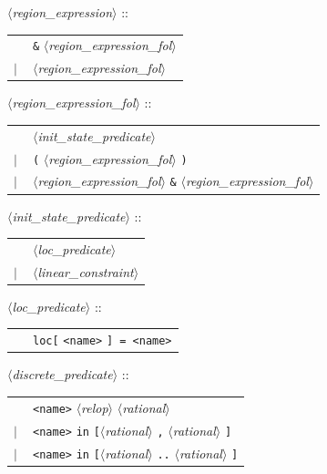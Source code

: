 \documentclass[a4paper,11pt]{report}
\newcommand{\nt}[1]{$\langle$\emph{#1}$\rangle$}
\newcommand{\regleGrammaire}[1]{\bigskip \noindent \nt{#1} :: \\}
\newcommand{\styleIMI}[1]{\textcolor{imicolor}{\texttt{#1}}}
\begin{document}
\regleGrammaire{region\_expression}
\begin{tabular}{l l}
	\  & \styleIMI{\&} \nt{region\_expression\_fol}\\
	$|$ & \nt{region\_expression\_fol}\\
\end{tabular}

\regleGrammaire{region\_expression\_fol}
\begin{tabular}{l l}
	\  & \nt{init\_state\_predicate} \\
	$|$ & \styleIMI{(} \nt{region\_expression\_fol} \styleIMI{)} \\
	$|$ & \nt{region\_expression\_fol} \styleIMI{\&} \nt{region\_expression\_fol} \\
\end{tabular}


\regleGrammaire{init\_state\_predicate}
\begin{tabular}{l l}
	\  & \nt{loc\_predicate} \\
	$|$ & \nt{linear\_constraint} \\
\end{tabular}

\regleGrammaire{loc\_predicate}
\begin{tabular}{l l}
	\  & \styleIMI{loc[} \styleIMI{<name>} \styleIMI{] = \styleIMI{<name>}} \\
\end{tabular}


\regleGrammaire{discrete\_predicate}
\begin{tabular}{l l}
	\  & \styleIMI{<name>} \nt{relop} \nt{rational} \\
	$|$ & \styleIMI{<name>} \styleIMI{in} \styleIMI{[}\nt{rational} \styleIMI{,} \nt{rational} \styleIMI{]} \\
	$|$ & \styleIMI{<name>} \styleIMI{in} \styleIMI{[}\nt{rational} \styleIMI{..} \nt{rational} \styleIMI{]} \\
\end{tabular}
\end{document}
